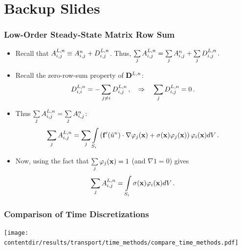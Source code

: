 \documentclass{beamer} \useoutertheme{infolines}
\newcommand{\contentdir}{../../dissertation/content}
\begin{document}
\section{Backup Slides}
\begin{frame}
\frametitle{Low-Order Steady-State Matrix Row Sum}

\begin{itemize}
  \item Recall that $A_{i,j}^{L,n}\equiv A_{i,j}^{n}
    +D_{i,j}^{L,n}$. Thus,
      $\sum\limits_jA_{i,j}^{L,n} = \sum\limits_jA_{i,j}^{n}
      +\sum\limits_jD_{i,j}^{L,n} \,.$
  \item Recall the zero-row-sum property of $\diffusionmatrix^{L,n}$:
    \begin{equation}
      D_{i,i}^{L,n} =
        -\sum_{j\ne i}D_{i,j}^{L,n}
      \,, \quad \Rightarrow \quad
        \sum\limits_jD_{i,j}^{L,n} = 0 \,.
    \end{equation}
  \item Thus $\sum\limits_jA^{L,n}_{i,j} =
   \sum\limits_j A^{n}_{i,j}$:
\begin{equation}
  \sum\limits_jA^{L,n}_{i,j} = \sum\limits_j \int\limits_{S_i}
    \left(\mathbf{f}'(\tilde{u}^n)
      \cdot\nabla\varphi_j(\mathbf{x}) +
      \sigma(\mathbf{x})\varphi_j(\mathbf{x})\right)\varphi_i(\mathbf{x}) dV \,.
\end{equation}
  \item Now, using the fact that $\sum\limits_j\varphi_j(\mathbf{x})=1$
    (and $\nabla 1 = 0$) gives
    \begin{equation}
      \sum\limits_jA^{L,n}_{i,j} =
        \int\limits_{S_i}\sigma(\mathbf{x})\varphi_i(\mathbf{x}) dV \,.
    \end{equation}
\end{itemize}

\end{frame}
\begin{frame}
\frametitle{Comparison of Time Discretizations}

\begin{center}
   \texttt{[image: \\contentdir/results/transport/time\_methods/compare\_time\_methods.pdf]}
\end{center}

\end{frame}
\end{document}
